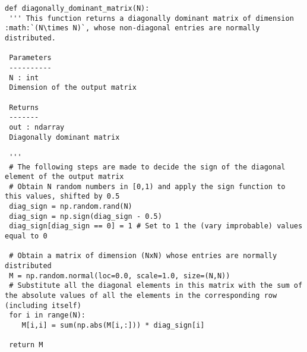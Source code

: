 \documentclass[a4paper,11pt]{report}
\begin{document}
\begin{verbatim}
def diagonally_dominant_matrix(N):
 ''' This function returns a diagonally dominant matrix of dimension :math:`(N\times N)`, whose non-diagonal entries are normally distributed.

 Parameters
 ----------
 N : int
 Dimension of the output matrix

 Returns
 -------
 out : ndarray
 Diagonally dominant matrix

 '''
 # The following steps are made to decide the sign of the diagonal element of the output matrix
 # Obtain N random numbers in [0,1) and apply the sign function to this values, shifted by 0.5
 diag_sign = np.random.rand(N)
 diag_sign = np.sign(diag_sign - 0.5)
 diag_sign[diag_sign == 0] = 1 # Set to 1 the (vary improbable) values equal to 0

 # Obtain a matrix of dimension (NxN) whose entries are normally distributed
 M = np.random.normal(loc=0.0, scale=1.0, size=(N,N))
 # Substitute all the diagonal elements in this matrix with the sum of the absolute values of all the elements in the corresponding row (including itself)
 for i in range(N):
    M[i,i] = sum(np.abs(M[i,:])) * diag_sign[i]

 return M
\end{verbatim}
\end{document}

